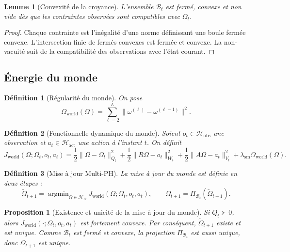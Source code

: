 \documentclass[11pt,a4paper]{article}
\newtheorem{definition}{Définition}[section]
\newtheorem{proposition}{Proposition}[section]
\newtheorem{lemma}{Lemme}[section]
\DeclareMathOperator{\argmin}{argmin}
\newcommand{\Hh}{\mathcal H}
\newcommand{\1}{\mathbf 1}
\begin{document}
\begin{lemma}[Convexité de la croyance]
L'ensemble \(\mathcal B_t\) est fermé, convexe et non vide dès que les contraintes observées sont compatibles avec \(\Omega_t\).
\end{lemma}

\begin{proof}
Chaque contrainte est l'inégalité d'une norme définissant une boule fermée convexe.  
L'intersection finie de fermés convexes est fermée et convexe.  
La non-vacuité suit de la compatibilité des observations avec l'état courant.
\end{proof}

\subsection{Énergie du monde}

\begin{definition}[Régularité du monde]
On pose
\[
\Omega_{\mathrm{world}}(\Omega)
=
\sum_{\ell=2}^{L}\|\omega^{(\ell)}-\omega^{(\ell-1)}\|^2.
\]
\end{definition}

\begin{definition}[Fonctionnelle dynamique du monde]
Soient \(o_t\in\Hh_{\mathrm{obs}}\) une observation et \(a_t\in\Hh_{\mathrm{act}}\) une action à l'instant \(t\).  
On définit
\[
J_{\mathrm{world}}(\Omega;\Omega_t,o_t,a_t)
=
\frac12\|\Omega-\Omega_t\|_{Q_t}^2
+
\frac12\|R\Omega-o_t\|_{W_t}^2
+
\frac12\|A\Omega-a_t\|_{V_t}^2
+
\lambda_{\mathrm{sm}}\Omega_{\mathrm{world}}(\Omega).
\]
\end{definition}

\begin{definition}[Mise à jour Multi-PH]
La mise à jour du monde est définie en deux étapes :
\[
\tilde\Omega_{t+1}
=
\argmin_{\Omega\in\Hh_\Omega}
J_{\mathrm{world}}(\Omega;\Omega_t,o_t,a_t),
\qquad
\Omega_{t+1}
=
\Pi_{\mathcal B_t}(\tilde\Omega_{t+1}).
\]
\end{definition}

\begin{proposition}[Existence et unicité de la mise à jour du monde]
Si \(Q_t\succ 0\), alors \(J_{\mathrm{world}}(\cdot;\Omega_t,o_t,a_t)\) est fortement convexe.  
Par conséquent, \(\tilde\Omega_{t+1}\) existe et est unique.  
Comme \(\mathcal B_t\) est fermé et convexe, la projection \(\Pi_{\mathcal B_t}\) est aussi unique, donc \(\Omega_{t+1}\) est unique.
\end{proposition}
\end{document}
